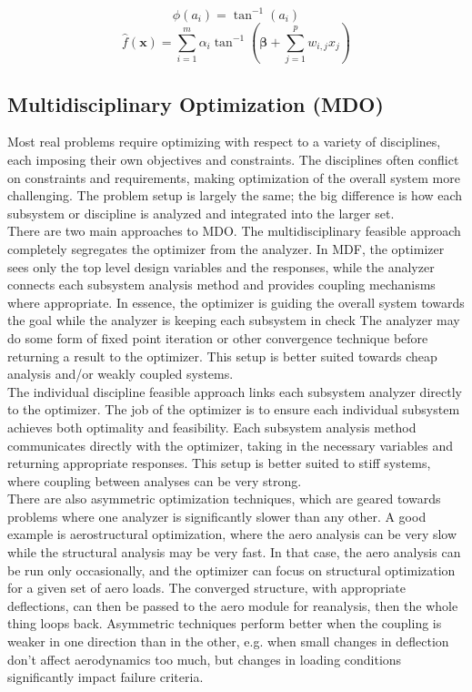 \documentclass[11pt]{article}
\newcommand{\sumlim}[2]{\sum\limits_{#1}^{#2}}
\newcommand{\boldx}{\mathbf{x}}
\begin{document}
$$\phi(a_i)=\tan^{-1}(a_i)$$
$$\hat{f}(\boldx) = \sumlim{i=1}{m}\alpha_i\tan^{-1}\left(\bm{\beta} + \sumlim{j=1}{p}w_{i,j}x_j\right)$$

\subsection{Multidisciplinary Optimization (MDO)}
Most real problems require optimizing with respect to a variety of disciplines, each imposing their own objectives and constraints. The disciplines often conflict on constraints and requirements, making optimization of the overall system more challenging. The problem setup is largely the same; the big difference is how each subsystem or discipline is analyzed and integrated into the larger set.\\

There are two main approaches to MDO. The multidisciplinary feasible approach completely segregates the optimizer from the analyzer. In MDF, the optimizer sees only the top level design variables and the responses, while the analyzer connects each subsystem analysis method and provides coupling mechanisms where appropriate. In essence, the optimizer is guiding the overall system towards the goal while the analyzer is keeping each subsystem in check The analyzer may do some form of fixed point iteration or other convergence technique before returning a result to the optimizer. This setup is better suited towards cheap analysis and/or weakly coupled systems.\\

The individual discipline feasible approach links each subsystem analyzer directly to the optimizer. The job of the optimizer is to ensure each individual subsystem achieves both optimality and feasibility. Each subsystem analysis method communicates directly with the optimizer, taking in the necessary variables and returning appropriate responses. This setup is better suited to stiff systems, where coupling between analyses can be very strong.\\

There are also asymmetric optimization techniques, which are geared towards problems where one analyzer is significantly slower than any other. A good example is aerostructural optimization, where the aero analysis can be very slow while the structural analysis may be very fast. In that case, the aero analysis can be run only occasionally, and the optimizer can focus on structural optimization for a given set of aero loads. The converged structure, with appropriate deflections, can then be passed to the aero module for reanalysis, then the whole thing loops back. Asymmetric techniques perform better when the coupling is weaker in one direction than in the other, e.g. when small changes in deflection don't affect aerodynamics too much, but changes in loading conditions significantly impact failure criteria.\\
\end{document}
